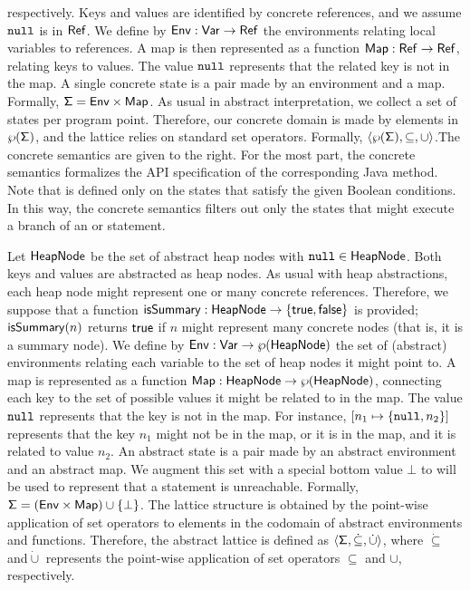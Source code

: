 respectively. Keys and values are identified by concrete references, and we assume $\mathtt{null}$ is in $\mathsf{Ref}$. We define by $\mathsf{Env} : \mathsf{Var} \to \mathsf{Ref}$ the environments relating local variables to references. A map is then represented as a function $\mathsf{Map} : \mathsf{Ref} \to \mathsf{Ref}$, relating keys to values. The value $\mathtt{null}$ represents that the related key is not in the map. A single concrete state
is a pair made by an environment and a map. Formally, $\mathsf{\Sigma} = \mathsf{Env} \times \mathsf{Map}$. As usual in abstract interpretation, we collect a set of states per program point. Therefore, our concrete domain is made by elements in $\wp(\mathsf{\Sigma})$, and the lattice relies on standard set operators. Formally, $\langle \wp(\mathsf{\Sigma}), \subseteq, \cup \rangle$.The concrete semantics are given
to the right.
 For the most part, the concrete semantics formalizes the API specification of the corresponding Java method. Note that  is defined only on the states that satisfy the given Boolean conditions. In this way, the concrete semantics filters out only the states that might execute a branch of an  or  statement.

%
Let $\mathsf{HeapNode}$ be the set of abstract heap nodes with $\mathtt{null} \in \mathsf{HeapNode}$. Both keys and values are abstracted as heap nodes. As usual with heap abstractions, each heap node might represent one or many concrete references. Therefore, we suppose that a function $\mathsf{isSummary} : \mathsf{HeapNode} \to \{\mathsf{true}, \mathsf{false}\}$ is provided; $\mathsf{isSummary}(n)$ returns $\mathsf{true}$ if $n$ might represent many concrete nodes (that is, it is a summary node). We define by $\mathsf{Env} : \mathsf{Var} \to \wp(\mathsf{HeapNode})$ the set of (abstract) environments relating each variable to the set of heap nodes it might point to. A map is represented as a function $\mathsf{Map} : \mathsf{HeapNode} \to \wp(\mathsf{HeapNode})$, connecting each key to the set of possible values it might be related to in the map. The value $\mathtt{null}$ represents that the key is not in the map. For instance, $[n_1 \mapsto \{\mathtt{null}, n_2\}]$ represents that the key $n_1$ might not be in the map, or it is in the map, and it is related to value $n_2$. An abstract state is a pair made by an abstract environment and an abstract map. We augment this set with a special bottom value $\bot$ to will be used to represent that a statement is unreachable. Formally, $\mathsf{\Sigma} = (\mathsf{Env} \times \mathsf{Map}) \cup \{\bot\}$.
%
The lattice structure is obtained by the point-wise application of set operators to elements in the codomain of abstract environments and functions. Therefore, the abstract lattice is defined as $\langle \mathsf{\Sigma}, \dot{\subseteq}, \dot{\cup} \rangle$, where $\dot{\subseteq}$ and$\dot{\cup}$ represents the point-wise application of set operators $\subseteq$ and $\cup$, respectively.

